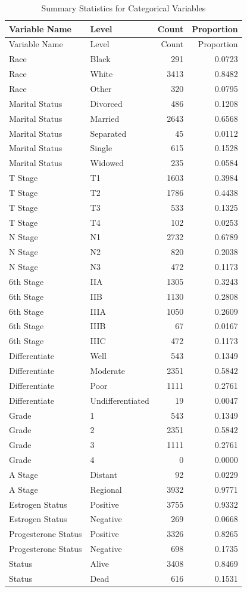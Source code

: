 \documentclass[
]{article}
\begin{document}
\begin{longtable}[]{@{}llrr@{}}
\caption{Summary Statistics for Categorical Variables}\tabularnewline
\toprule\noalign{}
Variable Name & Level & Count & Proportion \\
\midrule\noalign{}
\endfirsthead
\toprule\noalign{}
Variable Name & Level & Count & Proportion \\
\midrule\noalign{}
\endhead
\bottomrule\noalign{}
\endlastfoot
Race & Black & 291 & 0.0723 \\
Race & White & 3413 & 0.8482 \\
Race & Other & 320 & 0.0795 \\
Marital Status & Divorced & 486 & 0.1208 \\
Marital Status & Married & 2643 & 0.6568 \\
Marital Status & Separated & 45 & 0.0112 \\
Marital Status & Single & 615 & 0.1528 \\
Marital Status & Widowed & 235 & 0.0584 \\
T Stage & T1 & 1603 & 0.3984 \\
T Stage & T2 & 1786 & 0.4438 \\
T Stage & T3 & 533 & 0.1325 \\
T Stage & T4 & 102 & 0.0253 \\
N Stage & N1 & 2732 & 0.6789 \\
N Stage & N2 & 820 & 0.2038 \\
N Stage & N3 & 472 & 0.1173 \\
6th Stage & IIA & 1305 & 0.3243 \\
6th Stage & IIB & 1130 & 0.2808 \\
6th Stage & IIIA & 1050 & 0.2609 \\
6th Stage & IIIB & 67 & 0.0167 \\
6th Stage & IIIC & 472 & 0.1173 \\
Differentiate & Well & 543 & 0.1349 \\
Differentiate & Moderate & 2351 & 0.5842 \\
Differentiate & Poor & 1111 & 0.2761 \\
Differentiate & Undifferentiated & 19 & 0.0047 \\
Grade & 1 & 543 & 0.1349 \\
Grade & 2 & 2351 & 0.5842 \\
Grade & 3 & 1111 & 0.2761 \\
Grade & 4 & 0 & 0.0000 \\
A Stage & Distant & 92 & 0.0229 \\
A Stage & Regional & 3932 & 0.9771 \\
Estrogen Status & Positive & 3755 & 0.9332 \\
Estrogen Status & Negative & 269 & 0.0668 \\
Progesterone Status & Positive & 3326 & 0.8265 \\
Progesterone Status & Negative & 698 & 0.1735 \\
Status & Alive & 3408 & 0.8469 \\
Status & Dead & 616 & 0.1531 \\
\end{longtable}
\end{document}
